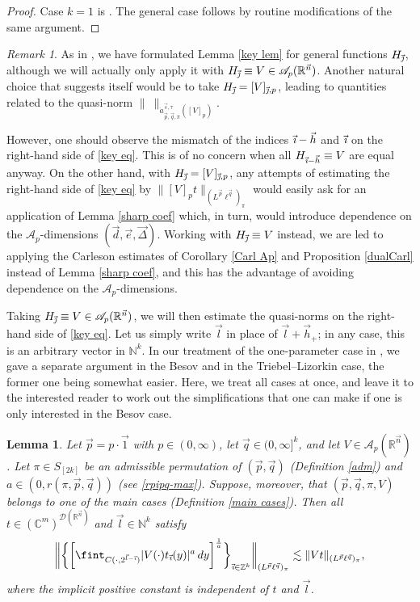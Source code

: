 \documentclass[11pt, reqno]{amsart}
\newtheorem{lemma}[theorem]{Lemma}
\theoremstyle{definition}
\theoremstyle{remark}
\newtheorem{remark}[theorem]{Remark}
\numberwithin{equation}{section}
\newcommand{\A}{\mathscr A}
\newcommand{\C}{\mathbb C}
\newcommand{\D}{\mathscr D}
\newcommand{\N}{\mathbb N}
\newcommand{\R}{\mathbb R}
\newcommand{\Z}{\mathbb Z}
\newcommand{\vone}{\vec 1}
\newcommand{\vd}{\vec d}
\newcommand{\vDe}{\vec{\Delta}}
\newcommand{\ve}{\vec e}
\newcommand{\vh}{\vec h}
\newcommand{\vi}{\vec{\textit{\i}}}
\newcommand{\vj}{\vec{\textit{\j}}}
\newcommand{\vn}{\vec n}
\newcommand{\vl}{\vec l}
\newcommand{\vp}{\vec p}
\newcommand{\vq}{\vec q}
\newcommand{\vs}{\vec s}
\newcommand{\atau}{\dot a^{\vs,\tau}_{\vp,\vq,\pi}}
\newcommand{\Red}[3]{[#1]_{#2,#3}}
\newcommand{\abs}[1]{|#1|}
\newcommand{\Norm}[2]{\|#1\|_{#2}}
\begin{document}
\begin{proof}
Case $k=1$ is \cite[Lemma 5.4 and Remark 5.5]{BHYY:1b}. The general case follows by routine modifications of the same argument.
\end{proof}

\begin{remark}
As in \cite[Lemma 5.4]{BHYY:1b}, we have formulated Lemma \ref{key lem} for general functions $H_{\vj}$, although we will actually only apply it with $H_{\vj}\equiv V\in\A_p(\R^{\vn})$. Another natural choice that suggests itself would be to take $H_{\vj}=\Red{V}{\vj}{p}$, leading to quantities related to the quasi-norm $\Norm{\ }{\atau([V]_p)}$.

However, one should observe the mismatch of the indices $\vi-\vh$ and $\vi$ on the right-hand side of \eqref{key eq}. This is of no concern when all $H_{\vi-\vh}\equiv V$ are equal anyway. On the other hand,
with $H_{\vj}=\Red{V}{\vj}{p}$, any attempts of estimating the right-hand side of \eqref{key eq} by $\Norm{[V]_p t}{(L^{\vp}\ell^{\vq})_\pi}$ would easily ask for an application of Lemma \ref{sharp coef} which, in turn, would introduce dependence on the $\A_p$-dimensions $(\vd,\ve,\vDe)$. Working with $H_{\vj}\equiv V$ instead, we are led to applying the Carleson estimates of Corollary \ref{Carl Ap} and Proposition \ref{dualCarl} instead of Lemma \ref{sharp coef}, and this has the advantage of avoiding dependence on the $\A_p$-dimensions.
\end{remark}

Taking $H_{\vj}\equiv V\in\A_p(\R^{\vn})$, we will then estimate the quasi-norms on the right-hand side of \eqref{key eq}. Let us simply write $\vl$ in place of $\vl+\vh_+$; in any case, this is an arbitrary vector in $\N^k$. In our treatment of the one-parameter case in \cite{BHYY:1b}, we gave a separate argument in the Besov and in the Triebel--Lizorkin case, the former one being somewhat easier. Here, we treat all cases at once, and leave it to the interested reader to work out the simplifications that one can make if one is only interested in the Besov case.

\begin{lemma}\label{key lem 2}
Let $\vp=p\cdot\vone$ with $p\in(0,\infty)$, let $\vq\in(0,\infty]^k$, and let $V\in\A_p(\R^{\vn})$.
Let $\pi\in S_{[2k]}$ be an admissible permutation of $(\vp,\vq)$ (Definition \ref{adm}) and $a\in(0,r(\pi,\vp,\vq))$ (see \eqref{rpipq-max}).
Suppose, moreover, that $(\vp,\vq,\pi,V)$ belongs to one of the main cases (Definition \ref{main cases}).
Then all $t\in(\C^m)^{\D(\R^{\vn})}$ and $\vl\in\N^k$ satisfy
\begin{equation*}
\bigg\|
\bigg\{\bigg[\fint_{C(\cdot,2^{\vl-\vi})}\abs{V(\cdot)t_{\vi}(y)}^a\, dy\bigg]^{\frac1a}\bigg\}_{\vi\in\Z^k}
\bigg\|_{(L^{\vp}\ell^{\vq})_\pi}
\lesssim\Norm{Vt}{(L^{\vp}\ell^{\vq})_\pi},
\end{equation*}
where the implicit positive constant is independent of $t$ and $\vl$.
\end{lemma}
\end{document}
